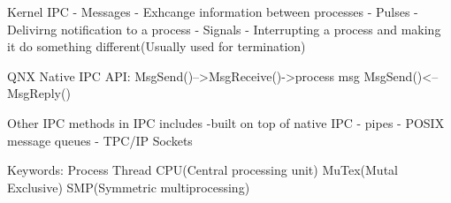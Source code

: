 Kernel IPC
- Messages
    - Exhcange information between processes
- Pulses
    - Delivirng notification to a process
- Signals
    - Interrupting a process and making it do something different(Usually used for termination)
    
QNX Native IPC API:
MsgSend()-->MsgReceive()->process msg
MsgSend()<--MsgReply()

Other IPC methods in IPC includes
    -built on top of native IPC
        - pipes
        - POSIX message queues
        - TPC/IP Sockets
        


Keywords:
Process
Thread
CPU(Central processing unit)
MuTex(Mutal Exclusive)
SMP(Symmetric multiprocessing)


